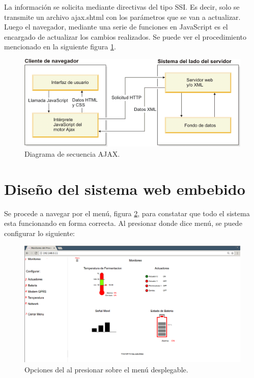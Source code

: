 La información se solicita mediante directivas del tipo SSI.
Es decir, solo se transmite un archivo ajax.shtml con los parámetros que se van a actualizar. Luego el navegador, mediante una serie de funciones en JavaScript es el encargado de actualizar los cambios realizados.  
Se puede ver el procedimiento mencionado en la siguiente figura \ref{fig:ajax_sec}.
\begin{figure}[!htb]
  \centering
  \includegraphics[scale=.8]{./Figures/ajax_sec.png}
  \caption{Diagrama de secuencia AJAX.}
  \label{fig:ajax_sec}
\end{figure}



\section{Diseño del sistema web embebido}
Se procede a navegar por el menú, figura \ref{fig:web_menus_num}, para constatar que todo el sistema esta funcionando en forma correcta. Al presionar donde dice menú, se puede configurar lo siguiente:

\begin{figure}[h]
  \centering
  \includegraphics[scale=.25]{./Figures/web_menus_num.png}
  \caption{Opciones del al presionar sobre el menú desplegable.}
  \label{fig:web_menus_num}
\end{figure}

